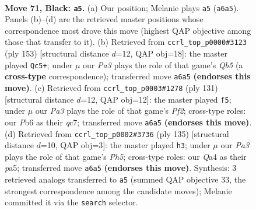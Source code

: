 \documentclass[11pt]{article}
\begin{document}
\clearpage

\begin{figure}[p]\centering
\begin{subfigure}{0.46\textwidth}\centering
\resizebox{\linewidth}{!}{%
\newchessgame
\chessboard[
  setfen={8/8/pp6/8/q1P5/2K5/7k/8 b - - 11 71},
  showmover=false,
  pgfstyle=straightmove, color=movearrow, markmove={a6-a5}
]}
\caption{}
\end{subfigure}\hfill
\begin{subfigure}{0.46\textwidth}\centering
\resizebox{\linewidth}{!}{%
\newchessgame
\chessboard[
  setfen={8/7k/8/4K3/pq4P1/8/Q7/8 b - - 13 77},
  showmover=false,
  pgfstyle=straightmove, color=movearrow, markmove={b4-c5}
]}
\caption{}
\end{subfigure}
\\[4pt]
\begin{subfigure}{0.46\textwidth}\centering
\resizebox{\linewidth}{!}{%
\newchessgame
\chessboard[
  setfen={8/2Q2p2/8/8/8/4Pq1k/3K4/8 b - - 6 66},
  showmover=false,
  pgfstyle=straightmove, color=movearrow, markmove={f7-f5}
]}
\caption{}
\end{subfigure}\hfill
\begin{subfigure}{0.46\textwidth}\centering
\resizebox{\linewidth}{!}{%
\newchessgame
\chessboard[
  setfen={8/8/p7/P7/5Pkp/4K3/8/8 b - - 2 68},
  showmover=false,
  pgfstyle=straightmove, color=movearrow, markmove={h4-h3}
]}
\caption{}
\end{subfigure}
\caption{\textbf{Move 71, Black: \texttt{a5}.} (a) Our position; Melanie plays \texttt{a5} (\texttt{a6a5}). Panels (b)--(d) are the retrieved master positions whose correspondence most drove this move (highest QAP objective among those that transfer to it). (b) Retrieved from \texttt{ccrl\_top\_p0000\#3123} (ply 153) [structural distance $d$=12, QAP obj=18]: the master played \texttt{Qc5+}; under $\mu$ our \emph{Pa3} plays the role of that game's \emph{Qb5} (a \textbf{cross-type} correspondence); transferred move \texttt{a6a5} \textbf{(endorses this move)}. (c) Retrieved from \texttt{ccrl\_top\_p0003\#1278} (ply 131) [structural distance $d$=12, QAP obj=12]: the master played \texttt{f5}; under $\mu$ our \emph{Pa3} plays the role of that game's \emph{Pf2}; cross-type roles: our \emph{P}b6 as their \emph{q}c7; transferred move \texttt{a6a5} \textbf{(endorses this move)}. (d) Retrieved from \texttt{ccrl\_top\_p0002\#3736} (ply 135) [structural distance $d$=10, QAP obj=3]: the master played \texttt{h3}; under $\mu$ our \emph{Pa3} plays the role of that game's \emph{Ph5}; cross-type roles: our \emph{Q}a4 as their \emph{p}a5; transferred move \texttt{a6a5} \textbf{(endorses this move)}. Synthesis: 3 retrieved analogs transferred to \texttt{a5} (summed QAP objective 33, the strongest correspondence among the candidate moves); Melanie committed it via the \texttt{search} selector.}
\label{fig:thought-m141}
\end{figure}
\end{document}
